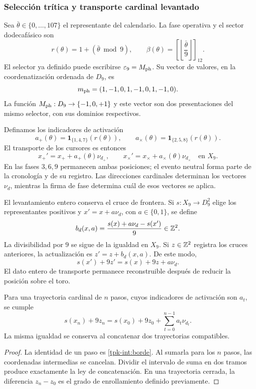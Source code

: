 \subsubsection{Selección trítica y transporte cardinal levantado}
\label{tpk-int:seleccion}

Sea \(\bar\theta\in\{0,\ldots,107\}\) el representante del calendario.
La fase operativa y el sector dodecafásico son
\begin{equation}
 r(\theta)=1+(\bar\theta\bmod9),\qquad
 \beta(\theta)=\left[\left\lfloor\frac{\bar\theta}{9}\right\rfloor\right]_{12}.
 \label{tpk-int:fase}
\end{equation}
El selector ya definido puede escribirse \(\varepsilon_9=M_{\rm ph}\).
Su vector de valores, en la coordenatización ordenada de \(D_9\), es
\[
 m_{\rm ph}=(1,-1,0,1,-1,0,1,-1,0).
\]
La función \(M_{\rm ph}:D_9\to\{-1,0,+1\}\) y este vector son dos
presentaciones del mismo selector, con sus dominios respectivos.

Definamos los indicadores de activación
\[
 a_+(\theta)=\mathbf1_{\{1,4,7\}}(r(\theta)),\qquad
 a_\times(\theta)=\mathbf1_{\{2,5,8\}}(r(\theta)).
\]
El transporte de los cursores es entonces
\begin{equation}
 x_+'=x_++a_+(\theta)\nu_{d_+},\qquad
 x_\times'=x_\times+a_\times(\theta)\nu_{d_\times}
 \quad\text{en }X_9.
 \label{tpk-int:cursores}
\end{equation}
En las fases \(3,6,9\) permanecen ambas posiciones; el evento neutral
forma parte de la cronología y de su registro. Las direcciones cardinales
determinan los vectores \(\nu_d\), mientras la firma de fase determina
cuál de esos vectores se aplica.

El levantamiento entero conserva el cruce de frontera. Si
\(s:X_9\to D_9^2\) elige los representantes positivos y
\(x'=x+a\nu_d\), con \(a\in\{0,1\}\), se define
\begin{equation}
 b_d(x,a)=\frac{s(x)+a\nu_d-s(x')}{9}\in\mathbb Z^2.
 \label{tpk-int:borde}
\end{equation}
La divisibilidad por \(9\) se sigue de la igualdad en \(X_9\).
Si \(z\in\mathbb Z^2\) registra los cruces anteriores, la actualización es
\(z'=z+b_d(x,a)\). De este modo,
\[
 s(x')+9z'=s(x)+9z+a\nu_d.
\]
El dato entero de transporte permanece reconstruible después de reducir
la posición sobre el toro.

\begin{proposition}
\label{tpk-int:prop-desplazamiento}
Para una trayectoria cardinal de \(n\) pasos, cuyos indicadores de
activación son \(a_t\), se cumple
\[
 s(x_n)+9z_n=s(x_0)+9z_0+
 \sum_{t=0}^{n-1}a_t\nu_{d_t}.
\]
La misma igualdad se conserva al concatenar dos trayectorias compatibles.
\end{proposition}
\begin{proof}
La identidad de un paso es \eqref{tpk-int:borde}. Al sumarla para los
\(n\) pasos, las coordenadas intermedias se cancelan. Dividir el intervalo
de suma en dos tramos produce exactamente la ley de concatenación. En una
trayectoria cerrada, la diferencia \(z_n-z_0\) es el grado de
enrollamiento definido previamente.
\end{proof}

